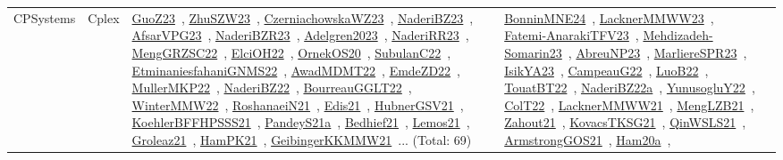 {\begin{longtable}{lp{3cm}>{\raggedright\arraybackslash}p{6cm}>{\raggedright\arraybackslash}p{6cm}>{\raggedright\arraybackslash}p{8cm}}
CPSystems & Cplex & \href{../works/GuoZ23.pdf}{GuoZ23}~\cite{GuoZ23}, \href{../works/ZhuSZW23.pdf}{ZhuSZW23}~\cite{ZhuSZW23}, \href{../works/CzerniachowskaWZ23.pdf}{CzerniachowskaWZ23}~\cite{CzerniachowskaWZ23}, \href{../works/NaderiBZ23.pdf}{NaderiBZ23}~\cite{NaderiBZ23}, \href{../works/AfsarVPG23.pdf}{AfsarVPG23}~\cite{AfsarVPG23}, \href{../works/NaderiBZR23.pdf}{NaderiBZR23}~\cite{NaderiBZR23}, \href{../works/Adelgren2023.pdf}{Adelgren2023}~\cite{Adelgren2023}, \href{../works/NaderiRR23.pdf}{NaderiRR23}~\cite{NaderiRR23}, \href{../works/MengGRZSC22.pdf}{MengGRZSC22}~\cite{MengGRZSC22}, \href{../works/ElciOH22.pdf}{ElciOH22}~\cite{ElciOH22}, \href{../works/OrnekOS20.pdf}{OrnekOS20}~\cite{OrnekOS20}, \href{../works/SubulanC22.pdf}{SubulanC22}~\cite{SubulanC22}, \href{../works/EtminaniesfahaniGNMS22.pdf}{EtminaniesfahaniGNMS22}~\cite{EtminaniesfahaniGNMS22}, \href{../works/AwadMDMT22.pdf}{AwadMDMT22}~\cite{AwadMDMT22}, \href{../works/EmdeZD22.pdf}{EmdeZD22}~\cite{EmdeZD22}, \href{../works/MullerMKP22.pdf}{MullerMKP22}~\cite{MullerMKP22}, \href{../works/NaderiBZ22.pdf}{NaderiBZ22}~\cite{NaderiBZ22}, \href{../works/BourreauGGLT22.pdf}{BourreauGGLT22}~\cite{BourreauGGLT22}, \href{../works/WinterMMW22.pdf}{WinterMMW22}~\cite{WinterMMW22}, \href{../works/RoshanaeiN21.pdf}{RoshanaeiN21}~\cite{RoshanaeiN21}, \href{../works/Edis21.pdf}{Edis21}~\cite{Edis21}, \href{../works/HubnerGSV21.pdf}{HubnerGSV21}~\cite{HubnerGSV21}, \href{../works/KoehlerBFFHPSSS21.pdf}{KoehlerBFFHPSSS21}~\cite{KoehlerBFFHPSSS21}, \href{../works/PandeyS21a.pdf}{PandeyS21a}~\cite{PandeyS21a}, \href{../works/Bedhief21.pdf}{Bedhief21}~\cite{Bedhief21}, \href{../works/Lemos21.pdf}{Lemos21}~\cite{Lemos21}, \href{../works/Groleaz21.pdf}{Groleaz21}~\cite{Groleaz21}, \href{../works/HamPK21.pdf}{HamPK21}~\cite{HamPK21}, \href{../works/GeibingerKKMMW21.pdf}{GeibingerKKMMW21}~\cite{GeibingerKKMMW21}... (Total: 69) & \href{../works/BonninMNE24.pdf}{BonninMNE24}~\cite{BonninMNE24}, \href{../works/LacknerMMWW23.pdf}{LacknerMMWW23}~\cite{LacknerMMWW23}, \href{../works/Fatemi-AnarakiTFV23.pdf}{Fatemi-AnarakiTFV23}~\cite{Fatemi-AnarakiTFV23}, \href{../works/Mehdizadeh-Somarin23.pdf}{Mehdizadeh-Somarin23}~\cite{Mehdizadeh-Somarin23}, \href{../works/AbreuNP23.pdf}{AbreuNP23}~\cite{AbreuNP23}, \href{../works/MarliereSPR23.pdf}{MarliereSPR23}~\cite{MarliereSPR23}, \href{../works/IsikYA23.pdf}{IsikYA23}~\cite{IsikYA23}, \href{../works/CampeauG22.pdf}{CampeauG22}~\cite{CampeauG22}, \href{../works/LuoB22.pdf}{LuoB22}~\cite{LuoB22}, \href{../works/TouatBT22.pdf}{TouatBT22}~\cite{TouatBT22}, \href{../works/NaderiBZ22a.pdf}{NaderiBZ22a}~\cite{NaderiBZ22a}, \href{../works/YunusogluY22.pdf}{YunusogluY22}~\cite{YunusogluY22}, \href{../works/ColT22.pdf}{ColT22}~\cite{ColT22}, \href{../works/LacknerMMWW21.pdf}{LacknerMMWW21}~\cite{LacknerMMWW21}, \href{../works/MengLZB21.pdf}{MengLZB21}~\cite{MengLZB21}, \href{../works/Zahout21.pdf}{Zahout21}~\cite{Zahout21}, \href{../works/KovacsTKSG21.pdf}{KovacsTKSG21}~\cite{KovacsTKSG21}, \href{../works/QinWSLS21.pdf}{QinWSLS21}~\cite{QinWSLS21}, \href{../works/ArmstrongGOS21.pdf}{ArmstrongGOS21}~\cite{ArmstrongGOS21}, \href{../works/Ham20a.pdf}{Ham20a}~\cite{Ham20a}, 
\end{longtable}}
